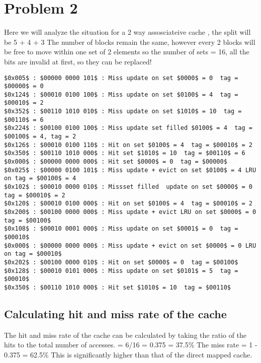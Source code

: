  \section{Problem 2}
 Here we will analyze the situation for a 2 way assosciateive cache , the split will be 5 + 4 + 3
 The number of blocks remain the same, however every 2 blocks will be free to move within one set of 2 elements
 so the number of sets = 16, all the bits are invalid at first, so they can be replaced!
\begin{verbatim}
$0x005$ : $00000 0000 101$ : Miss update on set $0000$ = 0  tag = $00000$ = 0
$0x124$ : $00010 0100 100$ : Miss update on set $0100$ = 4  tag = $00010$ = 2
$0x352$ : $00110 1010 010$ : Miss update on set $1010$ = 10  tag = $00110$ = 6
$0x224$ : $00100 0100 100$ : Miss update set filled $0100$ = 4  tag = $00100$ = 4, tag = 2
$0x126$ : $00010 0100 110$ : Hit on set $0100$ = 4  tag = $00010$ = 2
$0x350$ : $00110 1010 000$ : Hit set $1010$ = 10  tag = $00110$ = 6
$0x000$ : $00000 0000 000$ : Hit set $0000$ = 0  tag = $00000$
$0x025$ : $00000 0100 101$ : Miss update + evict on set $0100$ = 4 LRU on tag = $00100$ = 4
$0x102$ : $00010 0000 010$ : Missset filled  update on set $0000$ = 0  tag = $00010$ = 2
$0x120$ : $00010 0100 000$ : Hit on set $0100$ = 4  tag = $00010$ = 2
$0x200$ : $00100 0000 000$ : Miss update + evict LRU on set $0000$ = 0  tag = $00100$
$0x108$ : $00010 0001 000$ : Miss update on set $0001$ = 0  tag = $00010$
$0x000$ : $00000 0000 000$ : Miss update + evict on set $0000$ = 0 LRU on tag = $00010$
$0x202$ : $00100 0000 010$ : Hit on set $0000$ = 0  tag = $00100$
$0x128$ : $00010 0101 000$ : Miss update on set $0101$ = 5  tag = $00010$
$0x350$ : $00110 1010 000$ : Hit set $1010$ = 10  tag = $00110$
\end{verbatim}

\subsection{Calculating hit and miss rate of the cache}
The hit and miss rate of the cache can be calculated by taking the ratio of the hits to the total number of accesses.
 = 6/16 = 0.375 = 37.5\%
 The miss rate = 1 - 0.375 = 62.5\%
This is significantly higher than that of the direct mapped cache.